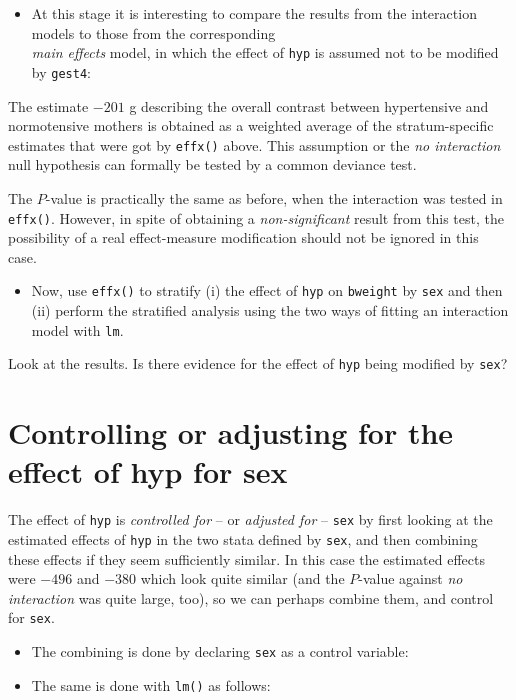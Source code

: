 \documentclass[
]{book}
\providecommand{\tightlist}{%
  \setlength{\itemsep}{0pt}\setlength{\parskip}{0pt}}
\begin{document}
\begin{itemize}
\tightlist
\item
  At this stage it is interesting to compare the results from the
  interaction models to those from the corresponding\\
  \emph{main effects} model, in which the effect of \texttt{hyp}
  is assumed not to be modified by \texttt{gest4}:
\end{itemize}

The estimate \(-201\) g describing the overall contrast
between hypertensive and normotensive mothers is obtained
as a weighted average of the stratum-specific estimates
that were got by \texttt{effx()} above.
This assumption or the
\emph{no interaction} null hypothesis can formally be tested by a common deviance test.

The \(P\)-value is practically the same as before,
when the interaction was tested in \texttt{effx()}.
However, in spite of obtaining a \emph{non-significant}
result from this test, the possibility
of a real effect-measure modification
should not be ignored in this case.

\begin{itemize}
\tightlist
\item
  Now, use \texttt{effx()} to stratify (i) the effect of \texttt{hyp} on \texttt{bweight} by \texttt{sex}
  and then (ii) perform the stratified analysis using the two ways of fitting an interaction model
  with \texttt{lm}.
\end{itemize}

Look at the results. Is there evidence for the effect of \texttt{hyp} being modified by \texttt{sex}?

\section{Controlling or adjusting for the effect of hyp for sex}\label{controlling-or-adjusting-for-the-effect-of-hyp-for-sex}

The effect of \texttt{hyp} is \emph{controlled for} -- or \emph{adjusted for} -- \texttt{sex}
by first looking at the estimated effects of \texttt{hyp} in the two stata defined by \texttt{sex}, and then combining these effects if they seem sufficiently similar. In this case the estimated effects were \(-496\) and \(-380\) which look quite similar (and the \(P\)-value against \emph{no interaction} was quite large, too),
so we can perhaps combine them, and control for \texttt{sex}.

\begin{itemize}
\item
  The combining is done by declaring \texttt{sex} as a control variable:
\item
  The same is done with \texttt{lm()} as follows:
\end{itemize}
\end{document}
